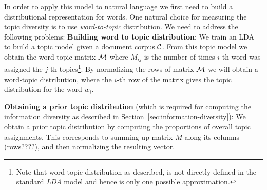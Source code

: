 \documentclass{article} %
\begin{document}
In order to apply this model to natural language we first need to build a distributional representation for words. One
natural choice for measuring the topic diversity is to use {\sl word-to-topic} distribution. We need to address the following problems:
{\bf Building word to topic distribution}: We train an
LDA~\cite{Blei:2003:LDA:944919.944937} to build a topic model given a document corpus ${\mathcal C}$. From this topic model we obtain the
word-topic matrix ${\mathcal M}$ where $M_{ij}$ is the number of times $i$-th word was assigned the $j$-th topics\footnote{Note that word-topic distribution as described, is not directly defined in the standard {\em LDA} model and hence is only one possible approximation.}. By normalizing the rows of matrix ${\mathcal M}$ we will obtain
a word-topic distribution, where the $i$-th row of the matrix gives the topic distribution for the word $w_i$.

{\bf Obtaining a prior topic distribution} (which is
required for computing the information diversity as described in Section~\ref{sec:information-diversity}): We obtain a prior
 topic distribution by computing the proportions of overall topic
 assignments. This corresponds to summing up matrix $M$ along its
 columns (rows????), and then normalizing the resulting vector.

\end{document}

